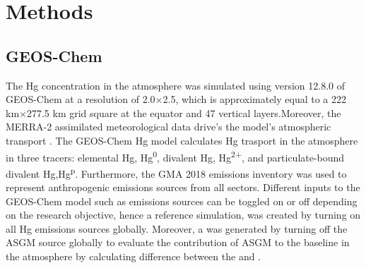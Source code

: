 \section{Methods}
\subsection{GEOS-Chem}
\begin{flushleft}

The Hg concentration in the atmosphere was simulated using version 12.8.0 of GEOS-Chem at a resolution of 2.0$\times$2.5, which is approximately equal to a 222 km$\times$277.5 km grid square at the equator and 47 vertical layers\cite{horowitz_new_2017}.Moreover, the MERRA-2 assimilated meteorological data drive's the model's atmospheric transport \cite{gelaro_modern-era_2017}. The GEOS-Chem Hg model calculates Hg trasport in the atmosphere in three tracers: elemental Hg, Hg\textsuperscript{0}, divalent Hg, Hg\textsuperscript{2+}, and particulate-bound divalent Hg,Hg\textsuperscript{p}. Furthermore, the GMA 2018 emissions inventory was used to represent anthropogenic emissions sources from all sectors\cite{steenhuisen_development_2019}. Different inputs to the GEOS-Chem model such as emissions sources can be toggled on or off depending on the research objective, hence a reference simulation, \on was created by turning on all Hg emissions sources globally. Moreover, a \off was generated by turning off the ASGM source globally to evaluate the contribution of ASGM to the baseline \hg in the atmosphere by calculating difference between the \on and \off.
\end{flushleft}

